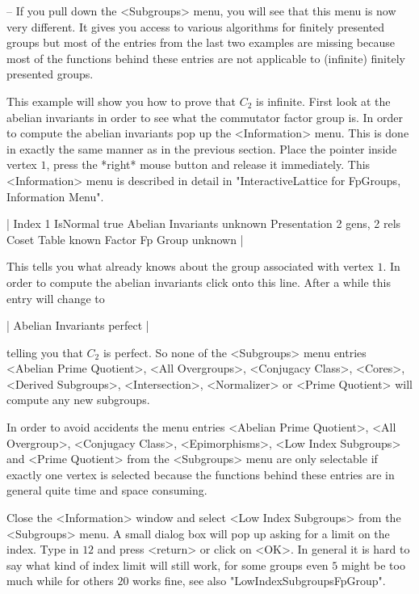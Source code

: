 -- If you pull down the <Subgroups> menu, you will see  that this menu is
now   very different.   It gives  you   access to various algorithms  for
finitely presented  groups  but most of  the  entries  from the last  two
examples  are missing because most of  the {\GAP}  functions behind these
entries are not applicable to (infinite) finitely presented groups.

This  example will show  you how to prove that  $C_2$ is infinite.  First
look at the abelian invariants in order to see what the commutator factor
group is.   In  order  to  compute the abelian    invariants pop  up  the
<Information> menu.   This is done in exactly  the same manner  as in the
previous section.  Place the pointer inside vertex $1$, press the *right*
mouse button and release   it  immediately.  This <Information> menu   is
described  in   detail in  "InteractiveLattice  for FpGroups, Information
Menu".

|    Index                  1
    IsNormal               true
    Abelian Invariants     unknown
    Presentation           2 gens, 2 rels
    Coset Table            known
    Factor Fp Group        unknown |

This tells you what {\GAP} already knows  about the group associated with
vertex $1$.   In order to compute the  abelian invariants click onto this
line.  After a while this entry will change to

|    Abelian Invariants     perfect |

telling you  that $C_2$  is perfect.   So none   of the  <Subgroups> menu
entries <Abelian  Prime Quotient>,  <All Overgroups>,  <Conjugacy Class>,
<Cores>,  <Derived Subgroups>,  <Intersection>,   <Normalizer> or  <Prime
Quotient> will compute any new subgroups.

In order  to avoid accidents  the menu entries  <Abelian Prime Quotient>,
<All Overgroup>, <Conjugacy Class>, <Epimorphisms>, <Low Index Subgroups>
and  <Prime  Quotient> from the  <Subgroups>  menu are only selectable if
exactly one vertex is selected because the functions behind these entries
are in general quite time and space consuming.

Close the <Information> window and select <Low  Index Subgroups> from the
<Subgroups> menu.  A small dialog box will  pop up asking  for a limit on
the index.  Type in $12$ and press <return> or click on <OK>.  In general
it  is hard to say what   kind of index  limit  will still work, for some
groups even $5$ might be too  much while for others  $20$ works fine, see
also "LowIndexSubgroupsFpGroup".

